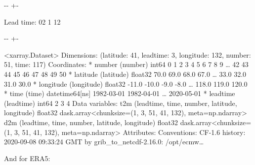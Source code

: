 \documentclass[letterpaper,10pt,english]{sphinxmanual}
\newlength\nbsphinxcodecellspacing
\begin{document}
{

\kern-\sphinxverbatimsmallskipamount\kern-\baselineskip
\kern+\FrameHeightAdjust\kern-\fboxrule
\vspace{\nbsphinxcodecellspacing}

\begin{sphinxVerbatim}[commandchars=\\\{\}]
Lead time: 02
1
12
\end{sphinxVerbatim}
}

{

\kern-\sphinxverbatimsmallskipamount\kern-\baselineskip
\kern+\FrameHeightAdjust\kern-\fboxrule
\vspace{\nbsphinxcodecellspacing}

\begin{sphinxVerbatim}[commandchars=\\\{\}]
\llap{\color{nbsphinxout}[4]:\,\hspace{\fboxrule}\hspace{\fboxsep}}<xarray.Dataset>
Dimensions:    (latitude: 41, leadtime: 3, longitude: 132, number: 51, time: 117)
Coordinates:
  * number     (number) int64 0 1 2 3 4 5 6 7 8 9 {\ldots} 42 43 44 45 46 47 48 49 50
  * latitude   (latitude) float32 70.0 69.0 68.0 67.0 {\ldots} 33.0 32.0 31.0 30.0
  * longitude  (longitude) float32 -11.0 -10.0 -9.0 -8.0 {\ldots} 118.0 119.0 120.0
  * time       (time) datetime64[ns] 1982-03-01 1982-04-01 {\ldots} 2020-05-01
  * leadtime   (leadtime) int64 2 3 4
Data variables:
    t2m        (leadtime, time, number, latitude, longitude) float32 dask.array<chunksize=(1, 3, 51, 41, 132), meta=np.ndarray>
    d2m        (leadtime, time, number, latitude, longitude) float32 dask.array<chunksize=(1, 3, 51, 41, 132), meta=np.ndarray>
Attributes:
    Conventions:  CF-1.6
    history:      2020-09-08 09:33:24 GMT by grib\_to\_netcdf-2.16.0: /opt/ecmw{\ldots}
\end{sphinxVerbatim}
}

And for ERA5:

{
\begin{sphinxVerbatim}[commandchars=\\\{\}]
\llap{\color{nbsphinxin}[5]:\,\hspace{\fboxrule}\hspace{\fboxsep}}   
\end{sphinxVerbatim}
}
\end{document}
